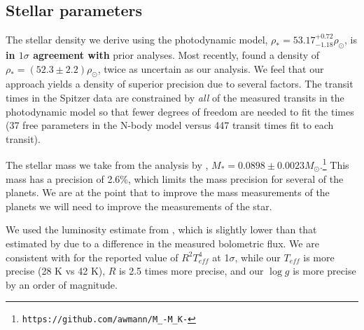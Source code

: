 \documentclass[twocolumn]{aastex63}
\begin{document}



\subsection{Stellar parameters}

The stellar density we derive using the photodynamic model, $\rho_* =
    53.17_{- 1.18}^{+0.72} \rho_\odot$, is \textbf{in $1\sigma$
agreement with} prior analyses.  %
Most recently, \citet{Delrez2018a}
found a density of $\rho_* = (52.3{\pm}2.2)\rho_\odot$,
twice as uncertain as our analysis.   We feel that our approach yields a density of superior
precision due to several factors.
The transit times in the Spitzer data are constrained by
    {\it all} of the measured transits in the photodynamic model
so that fewer degrees of freedom
are needed to fit the times (37 free parameters in the N-body
model versus 447 transit times fit to each transit).

The stellar mass we take from the analysis by \citet{Mann2019},
$M_* = 0.0898{\pm}0.0023 M_\odot$.\footnote{\texttt{https://github.com/awmann/M\_-M\_K-}}
This mass has a precision of 2.6\%, which limits the mass precision
for several of the planets.  We are at the point that to improve the mass measurements
of the planets we will need to improve the measurements of the star.

We used the luminosity estimate from \citet{Ducrot2020}, which is slightly lower than
that estimated by  \citet{Gonzales2019} due to a difference in the measured bolometric
flux.  We are consistent with \citet{Gonzales2019}
for the reported value of $R^2T_{eff}^4$ at 1$\sigma$, while our $T_{eff}$ is more precise
(28 K vs 42 K), $R$ is 2.5 times more precise, and our $\log{g}$ is more
precise by an order of magnitude.
\end{document}
